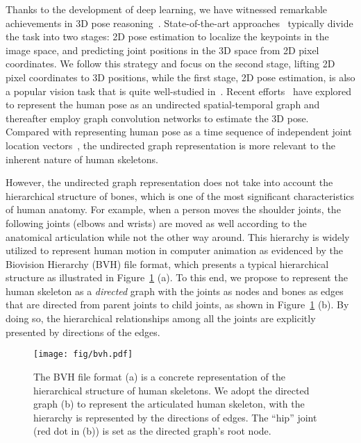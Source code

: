 \documentclass[sigconf]{acmart}
\begin{document}
Thanks to the development of deep learning, we have witnessed remarkable achievements in 3D pose reasoning~\cite{martinez2017simple,pavllo20193d,cai2019exploiting,voxelpose,wang2020motion,liu2020comprehensive,iqbal2020weakly,cheng2019occlusion,xu2020deep,cheng20203d,shi2020motionet,liu2020attention}.
State-of-the-art approaches~\cite{pavllo20193d,cheng2019occlusion,cai2019exploiting,wang2020motion,cheng20203d,liu2020attention} typically divide the task into two stages: 2D pose estimation to localize the keypoints in the image space, and predicting joint positions in the 3D space from 2D pixel coordinates.
We follow this strategy and focus on the second stage, lifting 2D pixel coordinates to 3D positions,
while the first stage, 2D pose estimation, is also a popular vision task that is quite well-studied in~\cite{chen2018cascaded,sun2019deep,cao2019openpose}.
Recent efforts~\cite{cai2019exploiting,wang2020motion} have explored to represent the human pose as an undirected spatial-temporal graph and thereafter employ graph convolution networks to estimate the 3D pose.
Compared with representing human pose as a time sequence of independent joint location vectors~\cite{martinez2017simple,pavllo20193d,cheng2019occlusion,liu2020attention}, the undirected graph representation is more relevant to the inherent nature of human skeletons. 


However, the undirected graph representation does not take into account the hierarchical structure of bones, which is one of the most significant characteristics of human anatomy.
For example, when a person moves the shoulder joints, the following joints (\ie elbows and wrists) are moved as well according to the anatomical articulation while not the other way around.
This hierarchy is widely utilized to represent human motion in computer animation as evidenced by the Biovision Hierarchy (BVH) file format,
which presents a typical hierarchical structure as illustrated in Figure~\ref{fig: BVH} (a).
To this end,
we propose to represent the human skeleton as a \emph{directed} graph with the joints as nodes and bones as edges that are directed from parent joints to child joints, as shown in Figure~\ref{fig: BVH} (b).
By doing so, the hierarchical relationships among all the joints are explicitly presented by directions of the edges.



\begin{figure}[!t] 
	\centering
	\texttt{[image: fig/bvh.pdf]}
	\vspace{-2mm}
	\caption{
		The BVH file format (a) is a concrete representation of the hierarchical structure of human skeletons. We adopt the directed graph (b) to represent the articulated human skeleton, with the hierarchy is represented by the directions of edges. The ``hip'' joint (red dot in (b)) is set as the  directed graph's root node.
	}
	\vspace{-5mm}
		\label{fig: BVH}
\end{figure} 
\end{document}

